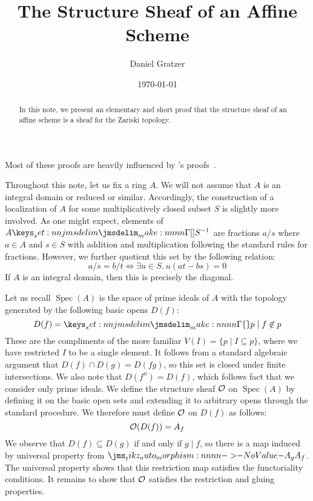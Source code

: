\documentclass{amsart}
\title{The Structure Sheaf of an Affine Scheme}
\author{Daniel Gratzer}
\date{\today}
\DeclareMathOperator{\Spec}{Spec}
\begin{document}
\begin{abstract}
  In this note, we present an elementary and short proof that the structure sheaf of an affine
  scheme is a sheaf for the Zariski topology.
\end{abstract}
\maketitle

Most of these proofs are heavily influenced by \citeauthor{vakil:rising-sea}'s
proofs~\parencite{vakil:rising-sea}.

Throughout this note, let us fix a ring $A$. We will not assume that $A$ is an integral domain or
reduced or similar. Accordingly, the construction of a localization of $A$ for some multiplicatively
closed subset $S$ is slightly more involved. As one might expect, elements of $\Localize{A}{S}$ are
fractions $a/s$ where $a \in A$ and $s \in S$ with addition and multiplication following the
standard rules for fractions. However, we further quotient this set by the following relation:
\begin{equation}
  a/s = b/t \iff \exists u \in S.\ u(at - bs) = 0
  \label{eq:frac-rel}
\end{equation}
If $A$ is an integral domain, then this is precisely the diagonal.

Let us recall $\Spec(A)$ is the space of prime ideals of $A$ with the topology generated by the
following basic opens $D(f)$:
\[
  D(f) = \braces{p \mid f \not\in p}
\]
These are the compliments of the more familiar $V(I) = \{p \mid I \subseteq p\}$, where we have
restricted $I$ to be a single element. It follows from a standard algebraic argument that
$D(f) \cap D(g) = D(fg)$, so this set is closed under finite intersections. We also note that
$D(f^n) = D(f)$, which follows fact that we consider only prime ideals. We define the structure
sheaf $\mathcal{O}$ on $\Spec(A)$ by defining it on the basic open sets and extending it to arbitrary
opens through the standard procedure. We therefore must define $\mathcal{O}$ on $D(f)$ as follows:
\[
  \mathcal{O}(D(f)) = A_f
\]
We observe that $D(f) \subseteq D(g)$ if and only if $g \mid f$, so there is a map induced by
universal property from $\Mor{A_g}{A_f}$. The universal property shows that this restriction map
satisfies the functoriality conditions. It remains to show that $\mathcal{O}$ satisfies the
restriction and gluing properties.
\end{document}
